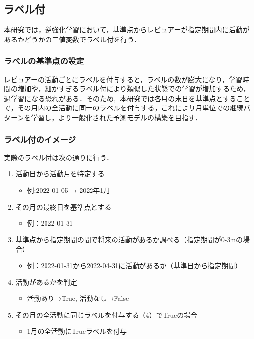 \documentclass[submit,techrep,noauthor]{ipsj}
\begin{document}
\subsection{ラベル付}
本研究では，逆強化学習において，基準点からレビュアーが指定期間内に活動があるかどうかの二値変数でラベル付を行う．
\subsubsection{ラベルの基準点の設定}
レビュアーの活動ごとにラベルを付与すると，ラベルの数が膨大になり，学習時間の増加や，細かすぎるラベル付により類似した状態での学習が増加するため，過学習になる恐れがある．そのため，本研究では各月の末日を基準点とすることで，その月内の全活動に同一のラベルを付与する，これにより月単位での継続パターンを学習し，より一般化された予測モデルの構築を目指す．
\subsubsection{ラベル付のイメージ}
実際のラベル付は次の通りに行う．
\begin{enumerate}
    \item 活動日から活動月を特定する
    \begin{itemize}
        \item 例:2022-01-05 → 2022年1月
    \end{itemize}
    \item その月の最終日を基準点とする
    \begin{itemize}
        \item 例：2022-01-31
    \end{itemize}
    \item 基準点から指定期間の間で将来の活動があるか調べる（指定期間が0-3mの場合）
    \begin{itemize}
        \item 例：2022-01-31から2022-04-31に活動があるか（基準日から指定期間）
    \end{itemize}
    \item 活動があるかを判定
    \begin{itemize}
        \item 活動あり→True, 活動なし→False
    \end{itemize}
        \item その月の全活動に同じラベルを付与する（4）でTrueの場合
    \begin{itemize}
        \item 1月の全活動にTrueラベルを付与
    \end{itemize}
\end{enumerate}
\end{document}
